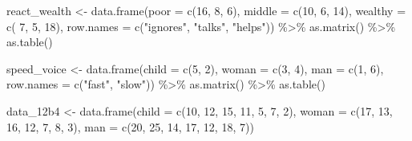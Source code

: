 \documentclass[
]{article}
\newenvironment{Shaded}{\begin{snugshade}}{\end{snugshade}}
\newcommand{\AttributeTok}[1]{\textcolor[rgb]{0.77,0.63,0.00}{#1}}
\newcommand{\DecValTok}[1]{\textcolor[rgb]{0.00,0.00,0.81}{#1}}
\newcommand{\FunctionTok}[1]{\textcolor[rgb]{0.00,0.00,0.00}{#1}}
\newcommand{\NormalTok}[1]{#1}
\newcommand{\OtherTok}[1]{\textcolor[rgb]{0.56,0.35,0.01}{#1}}
\newcommand{\SpecialCharTok}[1]{\textcolor[rgb]{0.00,0.00,0.00}{#1}}
\newcommand{\StringTok}[1]{\textcolor[rgb]{0.31,0.60,0.02}{#1}}
\begin{document}
\begin{Shaded}
\begin{Highlighting}[]
\NormalTok{react\_wealth }\OtherTok{\textless{}{-}} \FunctionTok{data.frame}\NormalTok{(}\AttributeTok{poor    =} \FunctionTok{c}\NormalTok{(}\DecValTok{16}\NormalTok{, }\DecValTok{8}\NormalTok{,  }\DecValTok{6}\NormalTok{),}
                           \AttributeTok{middle  =} \FunctionTok{c}\NormalTok{(}\DecValTok{10}\NormalTok{, }\DecValTok{6}\NormalTok{, }\DecValTok{14}\NormalTok{),}
                           \AttributeTok{wealthy =} \FunctionTok{c}\NormalTok{( }\DecValTok{7}\NormalTok{, }\DecValTok{5}\NormalTok{, }\DecValTok{18}\NormalTok{),}
                           \AttributeTok{row.names =} \FunctionTok{c}\NormalTok{(}\StringTok{"ignores"}\NormalTok{, }\StringTok{"talks"}\NormalTok{, }\StringTok{"helps"}\NormalTok{)) }\SpecialCharTok{\%\textgreater{}\%} 
  \FunctionTok{as.matrix}\NormalTok{() }\SpecialCharTok{\%\textgreater{}\%} 
  \FunctionTok{as.table}\NormalTok{() }


\NormalTok{speed\_voice }\OtherTok{\textless{}{-}} \FunctionTok{data.frame}\NormalTok{(}\AttributeTok{child =} \FunctionTok{c}\NormalTok{(}\DecValTok{5}\NormalTok{, }\DecValTok{2}\NormalTok{),}
                          \AttributeTok{woman =} \FunctionTok{c}\NormalTok{(}\DecValTok{3}\NormalTok{, }\DecValTok{4}\NormalTok{),}
                          \AttributeTok{man   =} \FunctionTok{c}\NormalTok{(}\DecValTok{1}\NormalTok{, }\DecValTok{6}\NormalTok{),}
                          \AttributeTok{row.names =} \FunctionTok{c}\NormalTok{(}\StringTok{"fast"}\NormalTok{, }\StringTok{"slow"}\NormalTok{)) }\SpecialCharTok{\%\textgreater{}\%} 
  \FunctionTok{as.matrix}\NormalTok{() }\SpecialCharTok{\%\textgreater{}\%} 
  \FunctionTok{as.table}\NormalTok{() }


\NormalTok{data\_12b4 }\OtherTok{\textless{}{-}} \FunctionTok{data.frame}\NormalTok{(}\AttributeTok{child =} \FunctionTok{c}\NormalTok{(}\DecValTok{10}\NormalTok{, }\DecValTok{12}\NormalTok{, }\DecValTok{15}\NormalTok{, }\DecValTok{11}\NormalTok{,  }\DecValTok{5}\NormalTok{,  }\DecValTok{7}\NormalTok{,  }\DecValTok{2}\NormalTok{),}
                        \AttributeTok{woman =} \FunctionTok{c}\NormalTok{(}\DecValTok{17}\NormalTok{, }\DecValTok{13}\NormalTok{, }\DecValTok{16}\NormalTok{, }\DecValTok{12}\NormalTok{,  }\DecValTok{7}\NormalTok{,  }\DecValTok{8}\NormalTok{,  }\DecValTok{3}\NormalTok{),}
                        \AttributeTok{man   =} \FunctionTok{c}\NormalTok{(}\DecValTok{20}\NormalTok{, }\DecValTok{25}\NormalTok{, }\DecValTok{14}\NormalTok{, }\DecValTok{17}\NormalTok{, }\DecValTok{12}\NormalTok{, }\DecValTok{18}\NormalTok{,  }\DecValTok{7}\NormalTok{))}
\end{Highlighting}
\end{Shaded}
\end{document}

